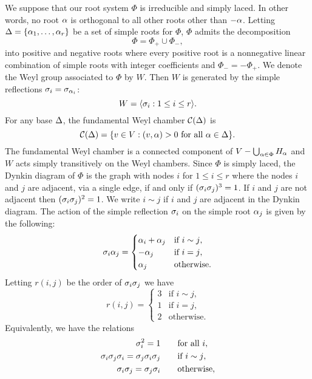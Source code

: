         We suppose that our root system $\Phi$ is irreducible and simply laced. In other words, no root $\alpha$ is orthogonal to all other roots other than $-\alpha$. Letting $\Delta = \{\alpha_{1},\ldots,\alpha_{r}\}$ be a set of simple roots for $\Phi$, $\Phi$ admits the decomposition
        \[
            \Phi = \Phi_{+} \cup \Phi_{-},
        \]
        into positive and negative roots where every positive root is a nonnegative linear combination of simple roots with integer coefficients and $\Phi_{-} = -\Phi_{+}$. We denote the Weyl group associated to $\Phi$ by $W$. Then $W$ is generated by the simple reflections $\sigma_{i} = \sigma_{\alpha_{i}}$:
        \[
            W = \langle\sigma_{i}:1 \le i \le r\rangle.
        \]
        For any base $\Delta$, the fundamental Weyl chamber $\mathcal{C}(\Delta)$ is
        \[
            \mathcal{C}(\Delta) = \{v \in V:(v,\alpha) > 0 \text{ for all } \alpha \in \Delta\}.
        \]
        The fundamental Weyl chamber is a connected component of $V-\bigcup_{\alpha \in \Phi}H_{\alpha}$ and $W$ acts simply transitively on the Weyl chambers. Since $\Phi$ is simply laced, the Dynkin diagram of $\Phi$ is the graph with nodes $i$ for $1 \le i \le r$ where the nodes $i$ and $j$ are adjacent, via a single edge, if and only if $(\sigma_{i}\sigma_{j})^{3} = 1$. If $i$ and $j$ are not adjacent then $(\sigma_{i}\sigma_{j})^{2} = 1$. We write $i \sim j$ if $i$ and $j$ are adjacent in the Dynkin diagram. The action of the simple reflection $\sigma_{i}$ on the simple root $\alpha_{j}$ is given by the following:
        \[
            \sigma_{i}\alpha_{j} = \begin{cases} \alpha_{i}+\alpha_{j} & \text{if $i \sim j$}, \\ -\alpha_{j} & \text{if $i = j$}, \\ \alpha_{j} & \text{otherwise}. \end{cases}
        \]
        Letting $r(i,j)$ be the order of $\sigma_{i}\sigma_{j}$ we have
        \[
            r(i,j) = \begin{cases} 3 & \text{if $i \sim j$}, \\ 1 & \text{if $i = j$}, \\ 2 & \text{otherwise}. \end{cases}
        \]
        Equivalently, we have the relations
        \begin{align*}
            \sigma_{i}^{2} = 1 \qquad &\text{for all $i$}, \\
            \sigma_{i}\sigma_{j}\sigma_{i} = \sigma_{j}\sigma_{i}\sigma_{j} \qquad &\text{if $i \sim j$}, \\
            \sigma_{i}\sigma_{j} = \sigma_{j}\sigma_{i} \qquad &\text{otherwise},
        \end{align*}
